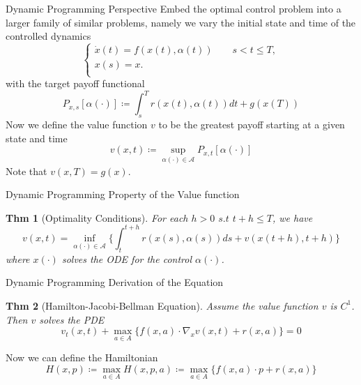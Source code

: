 \documentclass[english]{pkuslide}
\newtheorem{Thm}{Thm}
\begin{document}
\begin{frame}{Dynamic Programming} {Perspective}
Embed the optimal control problem into a larger family of similar problems, namely we vary the initial state and time of the controlled dynamics
\begin{equation}
  \left\{
   \begin{array}{l}
   \dot{x}(t) = f(x(t), \alpha(t)) \qquad s<t \leq T,  \\
   x(s) = x.  \\
   \end{array}
  \right.
\end{equation} 
with the target payoff functional
\begin{equation}
P_{x,s}[\alpha(\cdot)] \coloneqq \int_{s}^{T} r(x(t), \alpha(t))dt +g(x(T))
\end{equation}
Now we define the value function $v$ to be the greatest payoff starting at a given state and time
\begin{equation}
v(x,t)  \coloneqq \sup_{\alpha(\cdot) \in \mathcal{A}}{P_{x,t}[\alpha(\cdot)]}
\end{equation}
Note that $v(x,T)=g(x)$.
\end{frame}
\begin{frame}{Dynamic Programming} {Property of the Value function}
\begin{Thm}[Optimality Conditions]
For each $h>0$ $s.t$ $t+h\leq T$, we have
\begin{equation}
v(x, t)=\inf_{\alpha(\cdot) \in \mathcal{A}}{ \{ \int_{t}^{t+h}r(x(s), \alpha(s))ds +v(x(t+h), t+h)\}} 
\end{equation} 
where $x(\cdot)$ solves the ODE for the control $\alpha(\cdot)$.
\end{Thm}
\end{frame}
\begin{frame}{Dynamic Programming} {Derivation of the Equation}
\begin{Thm}[Hamilton-Jacobi-Bellman Equation]
Assume the value function $v$ is $C^1$. Then $v$ solves the PDE
\begin{equation}
v_{t}(x, t)+\max_{a \in A}{ \{ f(x, a)\cdot \nabla_{x}{v(x,t)} +r(x,a) \}} =0
\end{equation} 

\end{Thm}
Now we can define the Hamiltonian 
\begin{equation}
H(x,p) \coloneqq  \max_{a \in A}H(x,p,a) \coloneqq \max_{a \in A}{\{ f(x,a)\cdot p +r(x,a) \} }
\end{equation}
\end{frame}
\end{document}
